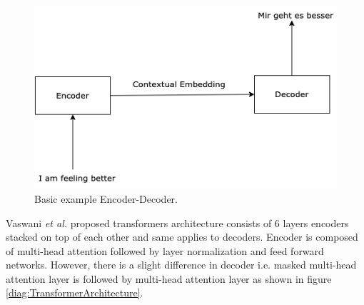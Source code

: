 \documentclass[%
	BCOR=8mm, %
	DIV=12,
	toc=bibliography, %
	toc=listof, %
	oneside, %
	egregdoesnotlikesansseriftitles, %
	]{scrbook}
\begin{document}
\begin{figure}[H]
    \centering
    \includegraphics[width=.50\textwidth]{img/encoderDecoder.png}
    \caption[Basic example of encoder-decoder]{Basic example Encoder-Decoder.}
    \label{diag:EncoderDecoder}
\end{figure}
 Vaswani \textit{et al.} \cite{vaswani_attention_2017} proposed transformers architecture consists of  6 layers encoders stacked on top of each other and same applies to decoders. Encoder is composed of multi-head attention followed by layer normalization and feed forward networks. However, there is a slight difference in decoder i.e. masked multi-head attention layer is followed by multi-head attention layer as shown in figure  \ref{diag:TransformerArchitecture}.
\end{document}
